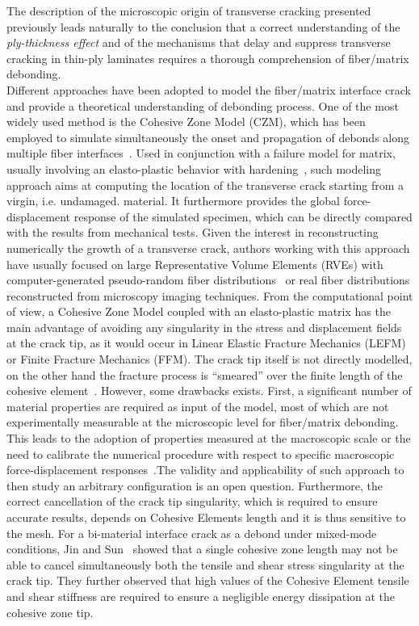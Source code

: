 The description of the microscopic origin of transverse cracking presented previously leads naturally to the conclusion that a correct understanding of the \emph{ply-thickness effect} and of the mechanisms that delay and suppress transverse cracking in thin-ply laminates requires a thorough comprehension of fiber/matrix debonding.\\
Different approaches have been adopted to model the fiber/matrix interface crack and provide a theoretical understanding of debonding process. One of the most widely used method is the Cohesive Zone Model (CZM), which has been employed to simulate simultaneously the onset and propagation of debonds along multiple fiber interfaces~\cite{Kushch2011,Canal2012,Bouhala2013,Herraez2015}. Used in conjunction with a failure model for matrix, usually involving an elasto-plastic behavior with hardening~\cite{Canal2012,Herraez2015}, such modeling approach aims at computing the location of the transverse crack starting from a virgin, i.e. undamaged. material. It furthermore provides the global force-displacement response of the simulated specimen, which can be directly compared with the results from mechanical tests. Given the interest in reconstructing numerically the growth of a transverse crack, authors working with this approach have usually focused on large Representative Volume Elements (RVEs) with computer-generated pseudo-random fiber distributions~\cite{Intro:Segurado2002,Intro:Elnekhaily2018} or real fiber distributions reconstructed from microscopy imaging techniques. From the computational point of view, a Cohesive Zone Model coupled with an elasto-plastic matrix has the main advantage of avoiding any singularity in the stress and displacement fields at the crack tip, as it would occur in Linear Elastic Fracture Mechanics (LEFM) or Finite Fracture Mechanics (FFM). The crack tip itself is not directly modelled, on the other hand the fracture process is ``smeared'' over the finite length of the cohesive element~\cite{Bazant1983}. However, some drawbacks exists. First, a significant number of material properties are required as input of the model, most of which are not experimentally measurable at the microscopic level for fiber/matrix debonding. This leads to the adoption of properties measured at the macroscopic scale or the need to calibrate the numerical procedure with respect to specific macroscopic force-displacement responses~\cite{Canal2012}.The validity and applicability of such approach to then study an arbitrary configuration is an open question. Furthermore, the correct cancellation of the crack tip singularity, which is required to ensure accurate results, depends on Cohesive Elements length and it is thus sensitive to the mesh. For a bi-material interface crack as a debond under mixed-mode conditions, Jin and Sun~\cite{Jin2005} showed that a single cohesive zone length may not be able to cancel simultaneously both the tensile and shear stress singularity at the crack tip. They further observed that high values of the Cohesive Element tensile and shear stiffness are required to ensure a negligible energy dissipation at the cohesive zone tip.
